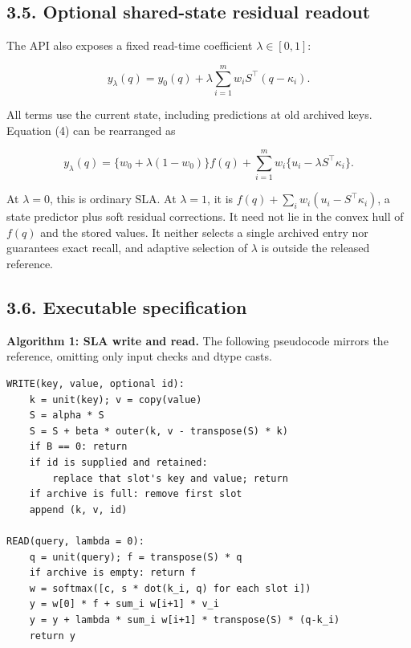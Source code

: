 \documentclass[11pt,a4paper]{article}
\begin{document}
\subsection{3.5. Optional shared-state residual readout}\label{optional-shared-state-residual-readout}

The API also exposes a fixed read-time coefficient \(\lambda\in[0,1]\):

\nopagebreak[4]

\[
y_{\lambda}(q)=y_0(q)+\lambda\sum_{i=1}^{m}w_iS^{\top}(q-\kappa_i).
\tag{4}
\]

All terms use the current state, including predictions at old archived keys. Equation (4) can be rearranged as

\nopagebreak[4]

\[
y_{\lambda}(q)=\{w_0+\lambda(1-w_0)\}f(q)
 +\sum_{i=1}^{m}w_i\{u_i-\lambda S^{\top}\kappa_i\}.
\tag{5}
\]

At \(\lambda=0\), this is ordinary SLA. At \(\lambda=1\), it is \(f(q)+\sum_iw_i(u_i-S^{\top}\kappa_i)\), a state predictor plus soft residual corrections. It need not lie in the convex hull of \(f(q)\) and the stored values. It neither selects a single archived entry nor guarantees exact recall, and adaptive selection of \(\lambda\) is outside the released reference.


\subsection{3.6. Executable specification}\label{executable-specification}

\textbf{Algorithm 1: SLA write and read.} The following pseudocode mirrors the reference, omitting only input checks and dtype casts.

\begin{minipage}{\linewidth}

\begin{verbatim}
WRITE(key, value, optional id):
    k = unit(key); v = copy(value)
    S = alpha * S
    S = S + beta * outer(k, v - transpose(S) * k)
    if B == 0: return
    if id is supplied and retained:
        replace that slot's key and value; return
    if archive is full: remove first slot
    append (k, v, id)

READ(query, lambda = 0):
    q = unit(query); f = transpose(S) * q
    if archive is empty: return f
    w = softmax([c, s * dot(k_i, q) for each slot i])
    y = w[0] * f + sum_i w[i+1] * v_i
    y = y + lambda * sum_i w[i+1] * transpose(S) * (q-k_i)
    return y
\end{verbatim}

\end{minipage}
\end{document}
